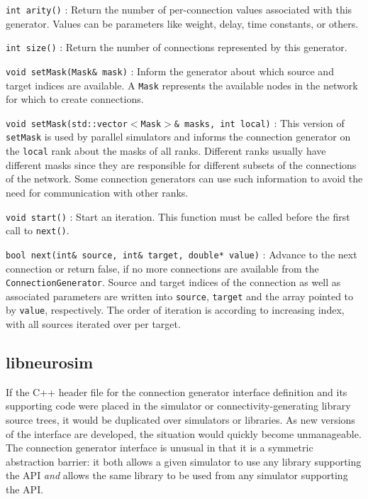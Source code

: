\documentclass{frontiersSCNS} %
\begin{document}
\begin{unlist}
\item[\tt int arity()]: Return the number of per-connection values
  associated with this generator. Values can be parameters like
  weight, delay, time constants, or others.
\item[\tt int size()]: Return the number of connections represented by
  this generator.
\item[\tt void setMask(Mask\& mask)]: Inform the generator about which
  source and target indices are available. A
  \verb|Mask| represents the available nodes in
  the network for which to create connections.
\item[\tt void setMask(std::vector$<$Mask$>$\& masks, int local)]:
  This version of \texttt{setMask} is used by parallel simulators and
  informs the connection generator on the \verb|local| rank about the
  masks of all ranks. Different ranks usually have different masks
  since they are responsible for different subsets of the connections
  of the network. Some connection generators can use such information
  to avoid the need for communication with other ranks.
\item[\tt void start()]: Start an iteration. This function must be called
  before the first call to \verb|next()|.
\item[\tt bool next(int\& source, int\& target, double* value)]:
  Advance to the next connection or return false, if no more
  connections are available from the \verb|ConnectionGenerator|.
  Source and target indices of the connection as well as associated
  parameters are written into \verb|source|, \verb|target| and the
  array pointed to by \verb|value|, respectively. The order of
  iteration is according to increasing index, with all sources
  iterated over per target.
\end{unlist}

\subsection{libneurosim}\label{sec:libneurosim}
If the C++ header file for the connection generator interface
definition and its supporting code were placed in the simulator or
connectivity-generating library source trees, it would be duplicated
over simulators or libraries.  As new versions of the interface are
developed, the situation would quickly become unmanageable. The
connection generator interface is unusual in that it is a symmetric
abstraction barrier: it both allows a given simulator to use any
library supporting the API \emph{and} allows the same library to be
used from any simulator supporting the API.
\end{document}
